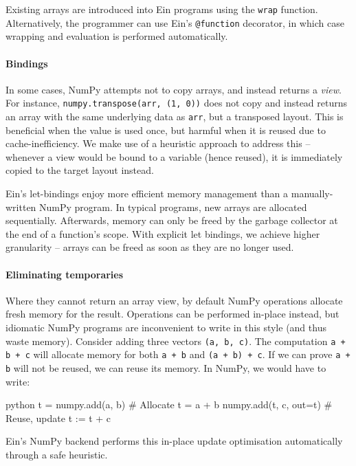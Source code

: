 Existing arrays are introduced into Ein programs using the \texttt{wrap} function.  Alternatively, the programmer can use Ein's \texttt{@function} decorator, in which case wrapping and evaluation is performed automatically.

\paragraph{Bindings} In some cases, NumPy attempts not to copy arrays, and instead returns a \textit{view}. For instance, \texttt{numpy.transpose(arr, (1, 0))} does not copy and instead returns an array with the same underlying data as \texttt{arr}, but a transposed layout. This is beneficial when the value is used once, but harmful when it is reused due to cache-inefficiency. We make use of a heuristic approach to address this -- whenever a view would be bound to a variable (hence reused), it is immediately copied to the target layout instead. 

Ein's let-bindings enjoy more efficient memory management than a manually-written NumPy program. In typical programs, new arrays are allocated sequentially. Afterwards, memory can only be freed by the garbage collector at the end of a function's scope. With explicit let bindings, we achieve higher granularity -- arrays can be freed as soon as they are no longer used.

\paragraph{Eliminating temporaries} Where they cannot return an array view, by default NumPy operations allocate fresh memory for the result. Operations can be performed in-place instead, but idiomatic NumPy programs are inconvenient to write in this style (and thus waste memory). Consider adding three vectors \texttt{(a, b, c)}. The computation \texttt{a + b + c} will allocate memory for both \texttt{a + b} and \texttt{(a + b) + c}. If we can prove \texttt{a + b} will not be reused, we can reuse its memory. In NumPy, we would have to write:
\begin{center}
\begin{cminted}{python}
t = numpy.add(a, b)     # Allocate t = a + b
numpy.add(t, c, out=t)  # Reuse, update t := t + c
\end{cminted}
\end{center}
Ein's NumPy backend performs this in-place update optimisation automatically through a safe heuristic.

